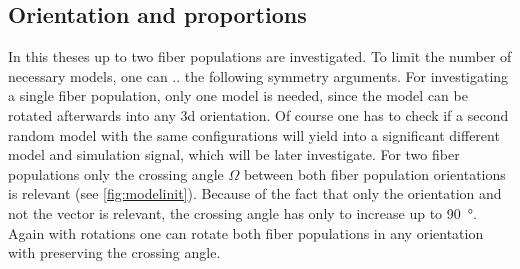 \subsection{Orientation and proportions}
% 
In this theses up to two fiber populations are investigated. 
To limit the number of necessary models, one can .. the following symmetry arguments.
% 
% 
For investigating a single fiber population, only one model is needed, since the model can be rotated afterwards into any 3d orientation.
Of course one has to check if a second random model with the same configurations will yield into a significant different model and simulation signal, which will be later investigate.
For two fiber populations only the crossing angle $\Omega$ between both fiber population orientations is relevant (see \cref{fig:modelinit}).
Because of the fact that only the orientation and not the vector is relevant, the crossing angle has only to increase up to \SI{90}{\degree}.
Again with rotations one can rotate both fiber populations in any orientation with preserving the crossing angle.
